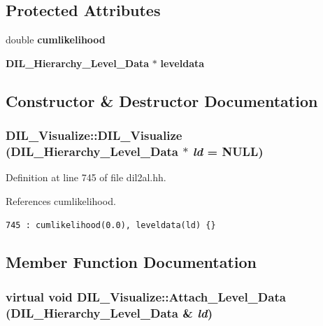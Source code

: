 \subsection*{Protected Attributes}
\begin{CompactItemize}
\item 
double {\bf cumlikelihood}
\item 
{\bf DIL\_\-Hierarchy\_\-Level\_\-Data} $\ast$ {\bf leveldata}
\end{CompactItemize}


\subsection{Constructor \& Destructor Documentation}
\subsubsection{\setlength{\rightskip}{0pt plus 5cm}DIL\_\-Visualize::DIL\_\-Visualize ({\bf DIL\_\-Hierarchy\_\-Level\_\-Data} $\ast$ {\em ld} = NULL)\hspace{0.3cm}{\tt  [inline]}}\label{classDIL__Visualize_a0}




Definition at line 745 of file dil2al.hh.

References cumlikelihood.



\footnotesize\begin{verbatim}745 : cumlikelihood(0.0), leveldata(ld) {}
\end{verbatim}\normalsize 


\subsection{Member Function Documentation}
\subsubsection{\setlength{\rightskip}{0pt plus 5cm}virtual void DIL\_\-Visualize::Attach\_\-Level\_\-Data ({\bf DIL\_\-Hierarchy\_\-Level\_\-Data} \& {\em ld})\hspace{0.3cm}{\tt  [inline, virtual]}}\label{classDIL__Visualize_a2}




